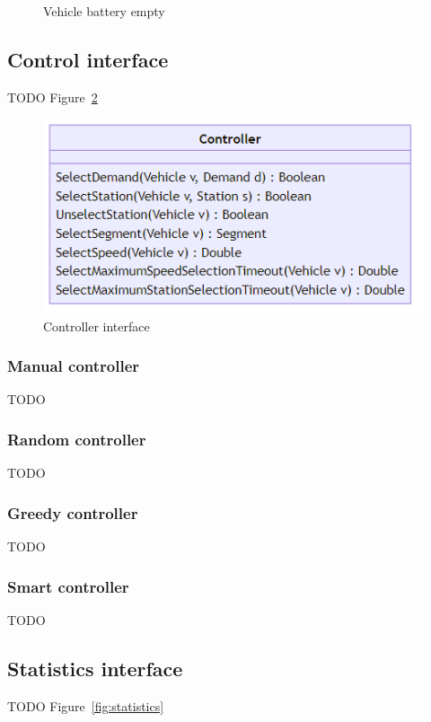 \documentclass{IEEEtran}
\begin{document}
    \begin{figure}[htbp]
        \centering
        \caption{Vehicle battery empty}
        \label{fig:vehicle-battery-empty}
    \end{figure}

    \subsection{Control interface}
    \label{sec:controller}
    TODO Figure~\ref{fig:controller}

    \begin{figure}[t]
        \centering
        \includegraphics[scale=0.5]{../../diagrams/controller/classes-minimal.png}
        \caption{Controller interface}
        \label{fig:controller}
    \end{figure}

    \subsubsection{Manual controller}
    TODO

    \subsubsection{Random controller}
    TODO
    
    \subsubsection{Greedy controller}
    TODO

    \subsubsection{Smart controller}
    TODO

    \subsection{Statistics interface}
    \label{sec:statistics}
    TODO Figure~\ref{fig:statistics}
\end{document}

